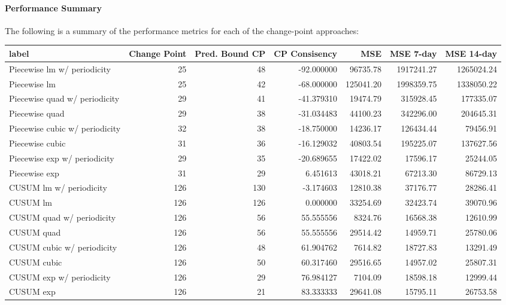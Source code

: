 \documentclass[
]{article}
\begin{document}
\hypertarget{performance-summary}{%
\paragraph{Performance Summary}\label{performance-summary}}

The following is a summary of the performance metrics for each of the
change-point approaches:

\begin{table}
\centering
\begin{tabular}{l|r|r|r|r|r|r}
\hline
label & Change Point & Pred. Bound CP & CP Consisency & MSE & MSE 7-day & MSE 14-day\\
\hline
Piecewise lm w/ periodicity & 25 & 48 & -92.000000 & 96735.78 & 1917241.27 & 1265024.24\\
\hline
Piecewise lm & 25 & 42 & -68.000000 & 125041.20 & 1998359.75 & 1338050.22\\
\hline
Piecewise quad w/ periodicity & 29 & 41 & -41.379310 & 19474.79 & 315928.45 & 177335.07\\
\hline
Piecewise quad & 29 & 38 & -31.034483 & 44100.23 & 342296.00 & 204645.31\\
\hline
Piecewise cubic w/ periodicity & 32 & 38 & -18.750000 & 14236.17 & 126434.44 & 79456.91\\
\hline
Piecewise cubic & 31 & 36 & -16.129032 & 40803.54 & 195225.07 & 137627.56\\
\hline
Piecewise exp w/ periodicity & 29 & 35 & -20.689655 & 17422.02 & 17596.17 & 25244.05\\
\hline
Piecewise exp & 31 & 29 & 6.451613 & 43018.21 & 67213.30 & 86729.13\\
\hline
CUSUM lm w/ periodicity & 126 & 130 & -3.174603 & 12810.38 & 37176.77 & 28286.41\\
\hline
CUSUM lm & 126 & 126 & 0.000000 & 33254.69 & 32423.74 & 39070.96\\
\hline
CUSUM quad w/ periodicity & 126 & 56 & 55.555556 & 8324.76 & 16568.38 & 12610.99\\
\hline
CUSUM quad & 126 & 56 & 55.555556 & 29514.42 & 14959.71 & 25780.06\\
\hline
CUSUM cubic w/ periodicity & 126 & 48 & 61.904762 & 7614.82 & 18727.83 & 13291.49\\
\hline
CUSUM cubic & 126 & 50 & 60.317460 & 29516.65 & 14957.02 & 25807.31\\
\hline
CUSUM exp w/ periodicity & 126 & 29 & 76.984127 & 7104.09 & 18598.18 & 12999.44\\
\hline
CUSUM exp & 126 & 21 & 83.333333 & 29641.08 & 15795.11 & 26753.58\\
\hline
\end{tabular}
\end{table}
\end{document}
